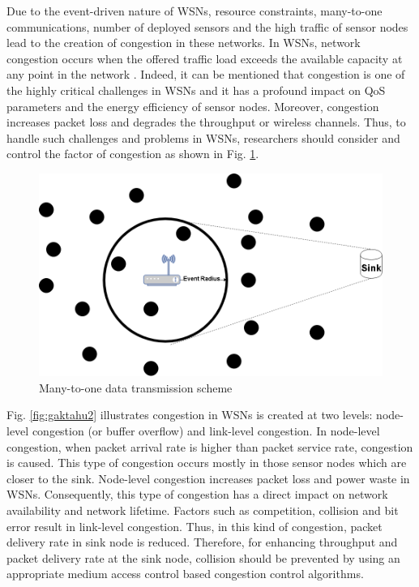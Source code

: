 Due to the event-driven nature of WSNs, resource constraints, many-to-one communications, number of deployed sensors and the high traffic of sensor nodes lead to the creation of congestion in these networks. In WSNs, network congestion occurs when the offered traffic load exceeds the available capacity at any point in the network \cite{5760292}. Indeed, it can be mentioned that congestion is one of the highly critical challenges in WSNs and it has a profound impact on QoS parameters and the energy efficiency of sensor nodes. Moreover, congestion increases packet loss and degrades the throughput or wireless channels. Thus, to handle such challenges and problems in WSNs, researchers should consider and control the factor of congestion as shown in Fig. \ref{fig:gaktahu1}. 

\begin{figure}
	\centering
	\includegraphics[width=1\linewidth]{pics/gaktahu1}
	\caption{Many-to-one data transmission scheme}
	\label{fig:gaktahu1}
\end{figure}


Fig. \ref{fig:gaktahu2} illustrates congestion in WSNs is created at two levels: node-level congestion (or buffer overflow) and link-level congestion. In node-level congestion, when packet arrival rate is higher than packet service rate, congestion is caused. This type of congestion occurs mostly in those sensor nodes which are closer to the sink.
Node-level congestion increases packet loss and power waste in WSNs. Consequently, this type of congestion has a direct impact on network availability and network lifetime. Factors such as competition, collision and bit error result in link-level congestion. Thus, in this kind of congestion, packet delivery rate in sink node is reduced. Therefore, for enhancing throughput and packet delivery rate at the sink node, collision should be prevented by using an appropriate medium access control based congestion control algorithms.

